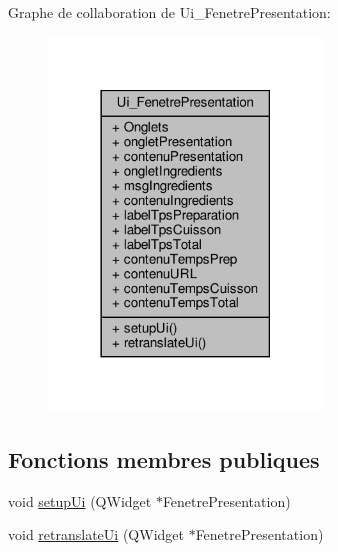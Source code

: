 Graphe de collaboration de Ui\+\_\+\+Fenetre\+Presentation\+:
\nopagebreak
\begin{figure}[H]
\begin{center}
\leavevmode
\includegraphics[width=206pt]{class_ui___fenetre_presentation__coll__graph}
\end{center}
\end{figure}
\subsection*{Fonctions membres publiques}
\begin{DoxyCompactItemize}
\item 
void \hyperlink{class_ui___fenetre_presentation_a08e799fcf97f8afe980e76770b4ef960}{setup\+Ui} (Q\+Widget $\ast$Fenetre\+Presentation)
\item 
void \hyperlink{class_ui___fenetre_presentation_a14a00db87b3b4ce5a1e3df9f754e19bb}{retranslate\+Ui} (Q\+Widget $\ast$Fenetre\+Presentation)
\end{DoxyCompactItemize}
